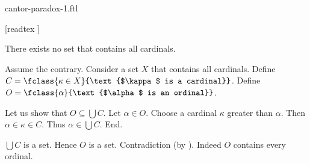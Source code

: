 \documentclass{article}
\begin{document}
\begin{smodule}{cantor-paradox-1.ftl}

  \begin{forthel}
    [readtex ]
  \end{forthel}

  \begin{ftheorem*}[label=cantor_paradox_1,title=Cantor's First Paradox]
    There exists no set that contains all cardinals.
  \end{ftheorem*}
  \begin{fproof}
    Assume the contrary.
    Consider a set $X$ that contains all cardinals.
    Define $C = \fclass{\kappa \in X}{\text{$\kappa$ is a cardinal}}$.
    Define $O = \fclass{\alpha}{\text{$\alpha$ is an ordinal}}$.

    Let us show that $O \subseteq \bigcup C$.
      Let $\alpha \in O$.
      Choose a cardinal $\kappa$ greater than $\alpha$.
      Then $\alpha \in \kappa \in C$.
      Thus $\alpha \in \bigcup C$.
    End.

    $\bigcup C$ is a set.
    Hence $O$ is a set.
    Contradiction (by ).
    Indeed $O$ contains every ordinal.
  \end{fproof}
\end{smodule}
\end{document}
